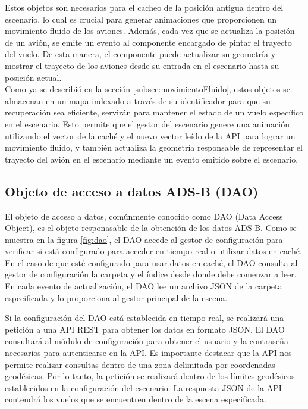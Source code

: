 \documentclass[a4paper, 11pt]{book}
\begin{document}
Estos objetos son necesarios para el cacheo de la posición antigua dentro del escenario, lo cual es crucial para generar animaciones que proporcionen un movimiento fluido de los aviones. Además, cada vez que se actualiza la posición de un avión, se emite un evento al componente encargado de pintar el trayecto del vuelo. De esta manera, el componente puede actualizar su geometría y mostrar el trayecto de los aviones desde su entrada en el escenario hasta su posición actual.
\\
Como ya se describió en la sección \ref{subsec:movimientoFluido}, estos objetos se almacenan en un mapa indexado a través de su identificador para que su recuperación sea eficiente, servirán para mantener el estado de un vuelo específico en el escenario. Esto permite que el gestor del escenario genere una animación utilizando el vector de la caché y el nuevo vector leído de la API para lograr un movimiento fluido, y también actualiza la geometría responsable de representar el trayecto del avión en el escenario mediante un evento emitido sobre el escenario.
\subsection{Objeto de acceso a datos ADS-B (DAO)}
\label{subsec:dao}
El objeto de acceso a datos, comúnmente conocido como DAO (Data Access Object), es el objeto responasable de la obtención de los datos ADS-B. Como se muestra en la figura \ref{fig:dao}, el DAO accede al gestor de configuración para verificar si está configurado para acceder en tiempo real o utilizar datos en caché. En el caso de que esté configurado para usar datos en caché, el DAO consulta al gestor de configuración la carpeta y el índice desde donde debe comenzar a leer. En cada evento de actualización, el DAO lee un archivo JSON de la carpeta especificada y lo proporciona al gestor principal de la escena.

Si la configuración del DAO está establecida en tiempo real, se realizará una petición a una API REST para obtener los datos en formato JSON. El DAO consultará al módulo de configuración para obtener el usuario y la contraseña necesarios para autenticarse en la API. Es importante destacar que la API nos permite realizar consultas dentro de una zona delimitada por coordenadas geodésicas. Por lo tanto, la petición se realizará dentro de los límites geodésicos establecidos en la configuración del escenario. La respuesta JSON de la API contendrá los vuelos que se encuentren dentro de la escena especificada.
\end{document}
